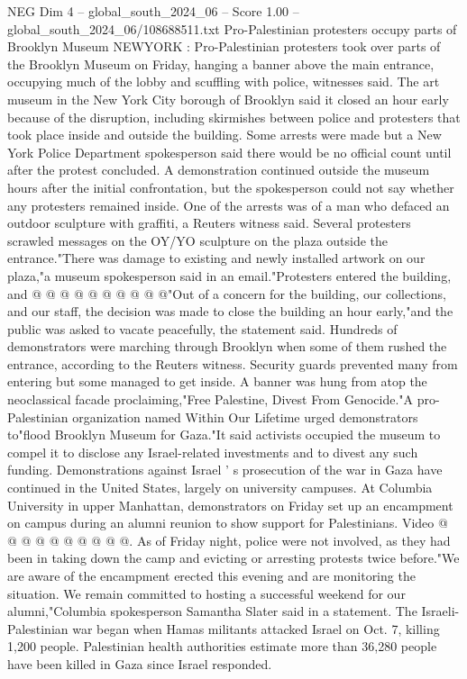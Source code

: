 \begin{textsample}{NEG Dim 4 – global\_south\_2024\_06 – Score 1.00 – global\_south\_2024\_06/108688511.txt}  \label{ex:f4_neg_373}
Pro-Palestinian protesters occupy parts of Brooklyn Museum NEWYORK : Pro-Palestinian protesters took over parts of the Brooklyn Museum on Friday, hanging a banner above the main entrance, occupying much of the lobby and scuffling with police, witnesses said.
The art museum in the New York City borough of Brooklyn said it closed an hour early because of the disruption, including skirmishes between police and protesters that took place inside and outside the building.
Some arrests were made but a New York Police Department spokesperson said there would be no official count until after the protest concluded.
A demonstration continued outside the museum hours after the initial confrontation, but the spokesperson could not say whether any protesters remained inside.
One of the arrests was of a man who defaced an outdoor sculpture with graffiti, a Reuters witness said.
Several protesters scrawled messages on the OY/YO sculpture on the plaza outside the entrance."There was damage to existing and newly installed artwork on our plaza,"a museum spokesperson said in an email."Protesters entered the building, and @ @ @ @ @ @ @ @ @ @"Out of a concern for the building, our collections, and our staff, the decision was made to close the building an hour early,"and the public was asked to vacate peacefully, the statement said.
Hundreds of demonstrators were marching through Brooklyn when some of them rushed the entrance, according to the Reuters witness.
Security guards prevented many from entering but some managed to get inside.
A banner was hung from atop the neoclassical facade proclaiming,"Free Palestine, Divest From Genocide."A pro-Palestinian organization named Within Our Lifetime urged demonstrators to"flood Brooklyn Museum for Gaza."It said activists occupied the museum to compel it to disclose any Israel-related investments and to divest any such funding.
Demonstrations against Israel ' s prosecution of the war in Gaza have continued in the United States, largely on university campuses.
At Columbia University in upper Manhattan, demonstrators on Friday set up an encampment on campus during an alumni reunion to show support for Palestinians.
Video @ @ @ @ @ @ @ @ @ @.
As of Friday night, police were not involved, as they had been in taking down the camp and evicting or arresting protests twice before."We are aware of the encampment erected this evening and are monitoring the situation.
We remain committed to hosting a successful weekend for our alumni,"Columbia spokesperson Samantha Slater said in a statement.
The Israeli-Palestinian war began when Hamas militants attacked Israel on Oct. 7, killing 1,200 people.
Palestinian health authorities estimate more than 36,280 people have been killed in Gaza since Israel responded.

\end{textsample}
